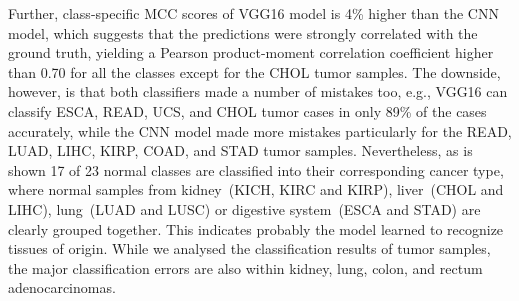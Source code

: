 \hspace*{3.5mm} Further, class-specific MCC scores of VGG16 model is 4\% higher than the CNN model, which suggests that the predictions were strongly correlated with the ground truth, yielding a Pearson product-moment correlation coefficient higher than 0.70 for all the classes except for the CHOL tumor samples. The downside, however, is that both classifiers made a number of mistakes too, e.g., VGG16 can classify ESCA, READ, UCS, and CHOL tumor cases in only 89\% of the cases accurately, while the CNN model made more mistakes particularly for the READ, LUAD, LIHC, KIRP, COAD, and STAD tumor samples. Nevertheless, as is shown 17 of 23 normal classes are classified into their corresponding cancer type, where normal samples from kidney~(KICH, KIRC and KIRP), liver~(CHOL and LIHC), lung~(LUAD and LUSC) or digestive system~(ESCA and STAD) are clearly grouped together. This indicates probably the model learned to recognize tissues of origin. While we analysed the classification results of tumor samples, the major classification errors are also within kidney, lung, colon, and rectum adenocarcinomas.

